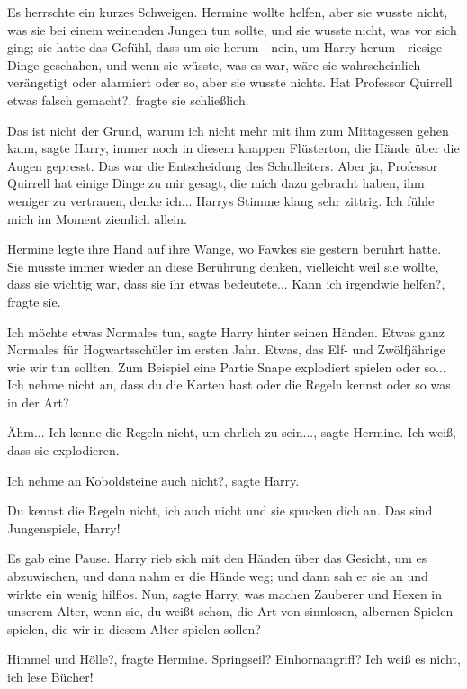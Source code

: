 Es herrschte ein kurzes Schweigen. Hermine wollte helfen, aber sie wusste nicht,
was sie bei einem weinenden Jungen tun sollte, und sie wusste nicht, was vor
sich ging; sie hatte das Gefühl, dass um sie herum - nein, um Harry herum -
riesige Dinge geschahen, und wenn sie wüsste, was es war, wäre sie
wahrscheinlich verängstigt oder alarmiert oder so, aber sie wusste nichts. \glqq
Hat Professor Quirrell etwas falsch gemacht?\grqq{}, fragte sie schließlich.

\glqq Das ist nicht der Grund, warum ich nicht mehr mit ihm zum Mittagessen
gehen kann\grqq{}, sagte Harry, immer noch in diesem knappen Flüsterton, die
Hände über die Augen gepresst. \glqq Das war die Entscheidung des Schulleiters.
Aber ja, Professor Quirrell hat einige Dinge zu mir gesagt, die mich dazu
gebracht haben, ihm weniger zu vertrauen, denke ich...\grqq{} Harrys Stimme
klang sehr zittrig. \glqq Ich fühle mich im Moment ziemlich allein.\grqq{}

Hermine legte ihre Hand auf ihre Wange, wo Fawkes sie gestern berührt hatte. Sie
musste immer wieder an diese Berührung denken, vielleicht weil sie wollte, dass
sie wichtig war, dass sie ihr etwas bedeutete... \glqq Kann ich irgendwie
helfen?\grqq{}, fragte sie.

\glqq Ich möchte etwas Normales tun\grqq{}, sagte Harry hinter seinen Händen.
\glqq Etwas ganz Normales für Hogwartsschüler im ersten Jahr. Etwas, das Elf-
und Zwölfjährige wie wir tun sollten. Zum Beispiel eine Partie Snape explodiert
spielen oder so... Ich nehme nicht an, dass du die Karten hast oder die Regeln
kennst oder so was in der Art?\grqq{}

\glqq Ähm... Ich kenne die Regeln nicht, um ehrlich zu sein...\grqq{}, sagte
Hermine. \glqq Ich weiß, dass sie explodieren.\grqq{}

\glqq Ich nehme an Koboldsteine auch nicht?\grqq{}, sagte Harry.

\glqq Du kennst die Regeln nicht, ich auch nicht und sie spucken dich an. Das
sind Jungenspiele, Harry!\grqq{}

Es gab eine Pause. Harry rieb sich mit den Händen über das Gesicht, um es
abzuwischen, und dann nahm er die Hände weg; und dann sah er sie an und wirkte
ein wenig hilflos. \glqq Nun\grqq{}, sagte Harry, \glqq was machen Zauberer und
Hexen in unserem Alter, wenn sie, du weißt schon, die Art von sinnlosen,
albernen Spielen spielen, die wir in diesem Alter spielen sollen?\grqq{}

\glqq Himmel und Hölle?\grqq{}, fragte Hermine. \glqq Springseil?
Einhornangriff? Ich weiß es nicht, ich lese Bücher!\grqq{}

